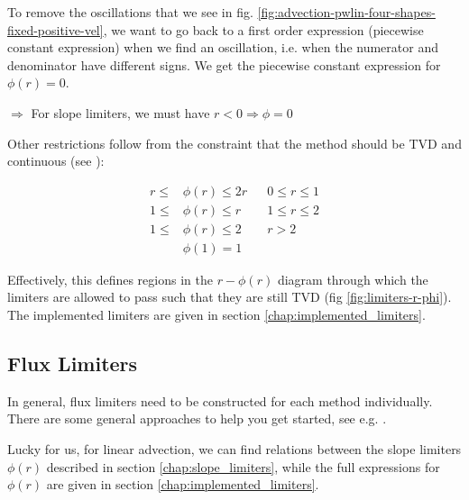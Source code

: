 To remove the oscillations that we see in fig. \ref{fig:advection-pwlin-four-shapes-fixed-positive-vel}, we want to go back to a first order expression (piecewise constant expression) when we find an oscillation, i.e. when the numerator and denominator have different signs.
We get the piecewise constant expression for $\phi(r) = 0$.

$\Rightarrow$ For slope limiters, we must have $r < 0 \Rightarrow \phi = 0$


Other restrictions follow from the constraint that the method should be TVD and continuous (see \cite{swebyHighResolutionSchemes1984}):

\begin{align}
	r \le& \phi(r) \le 2r 	&&	 0  \le r \le 1 \label{eq:TVD-consequence-first}\\
	1 \le& \phi(r) \le r 	&&	 1 \le r \le 2 \\
	1 \le& \phi(r) \le 2 	&&	 r > 2 \\
	& \phi(1) = 1 &&  \label{eq:TVD-consequence-last}
\end{align}



Effectively, this defines regions in the $r-\phi(r)$ diagram through which the limiters are allowed to pass such that they are still TVD (fig \ref{fig:limiters-r-phi}).
The implemented limiters are given in section \ref{chap:implemented_limiters}.




















\subsection{Flux Limiters}






In general, flux limiters need to be constructed for each method individually.
There are some general approaches to help you get started, see e.g. \cite{Toro}.

Lucky for us, for linear advection, we can find relations between the slope limiters $\phi(r)$ described in section \ref{chap:slope_limiters}, while the full expressions for $\phi(r)$ are given in section \ref{chap:implemented_limiters}.





